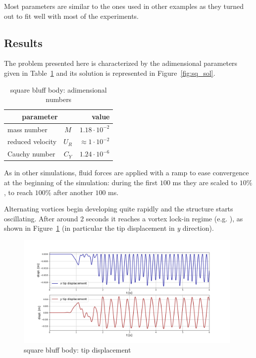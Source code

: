 Most parameters are similar to the ones used in other examples as they turned out to fit well with most of the experiments. 

\subsection{Results}

The problem presented here is characterized by the adimensional parameters given in Table~\ref{table:sq-adim} and its solution is represented in Figure~\ref{fig:sq_sol}.

\begin{table}[!htb]
	\begin{center}
		\begin{tabular}{ l c | r } 
			\multicolumn{2}{c|}{parameter} & value   \\ 
			\hline
			mass number  & $M$ & $ 1.18\cdot 10^{-2}$     \\
			reduced velocity & $U_R$ & $ \approx 1\cdot 10^{-2}$  \\
			Cauchy number  & $C_Y$ & $  1.24 \cdot 10^{-6}$  \\			
		\end{tabular}
	\end{center}
	\caption{square bluff body: adimensional numbers}
	\label{table:sq-adim}
\end{table}

As in other simulations, fluid forces are applied with a ramp to ease convergence at the beginning of the simulation: during the first $100$ \si{ms} they are scaled to $10\%$, to reach $100\%$ after another $100$ \si{ms}.

Alternating vortices begin developing quite rapidly and the structure starts oscillating. After around 2 seconds it reaches a vortex lock-in regime (e.g. \cite{hong2001fluid}), as shown in Figure~\ref{fig:sq_displacement} (in particular the tip displacement in \textit{y} direction).



\begin{figure}[htbp!]
	\centering
	\includegraphics[width=0.98\textwidth, trim=20 20 20 50, clip]{images/sq-cyl/disp_sq.png}
	\caption{square bluff body: tip displacement}
	\label{fig:sq_displacement}
\end{figure}

